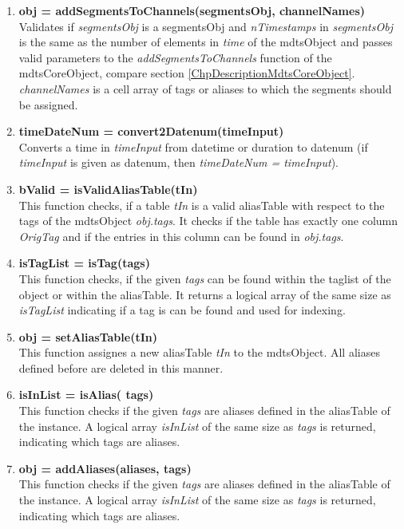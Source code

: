 \documentclass[a4]{scrreprt}
\begin{document}
\begin{enumerate}
\item \textbf{obj = addSegmentsToChannels(segmentsObj, channelNames)}\\
Validates if \textit{segmentsObj} is a segmentsObj and \textit{nTimestamps} in \textit{segmentsObj} is the same as the number of elements in \textit{time} of the mdtsObject and passes valid parameters to the \textit{addSegmentsToChannels} function of the mdtsCoreObject, compare section \ref{ChpDescriptionMdtsCoreObject}. \textit{channelNames} is a cell array of tags or aliases to which the segments should be assigned.

\item \textbf{timeDateNum = convert2Datenum(timeInput)}\\
Converts a time in \textit{timeInput} from datetime or duration to datenum (if \textit{timeInput} is given as datenum, then \textit{timeDateNum = timeInput}).

\item \textbf{bValid = isValidAliasTable(tIn)}\\
This function checks, if a table \textit{tIn} is a valid aliasTable with respect to the tags of the mdtsObject \textit{obj.tags}. It checks if the table has exactly one column \textit{OrigTag} and if the entries in this column can be found in \textit{obj.tags}.

\item \textbf{isTagList = isTag(tags)}\\
This function checks, if the given \textit{tags} can be found within the taglist of the object or within the aliasTable. It returns a logical array of the same size as \textit{isTagList} indicating if a tag is can be found and used for indexing.

\item \textbf{obj =  setAliasTable(tIn)}\\
This function assignes a new aliasTable \textit{tIn} to the mdtsObject. All aliases defined before are deleted in this manner.

\item \textbf{isInList = isAlias( tags)}\\
This function checks if the given \textit{tags} are aliases defined in the aliasTable of the instance. A logical array \textit{isInList} of the same size as \textit{tags} is returned, indicating which tags are aliases.

\item \textbf{obj = addAliases(aliases, tags)}\\
This function checks if the given \textit{tags} are aliases defined in the aliasTable of the instance. A logical array \textit{isInList} of the same size as \textit{tags} is returned, indicating which tags are aliases.

\end{enumerate}
\end{document}
